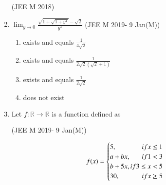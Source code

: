 \documentclass[journal,12pt,twocolumn]{IEEEtran}
\theoremstyle{remark}
\begin{document}
\begin{enumerate}[start=36]
	\hfill{(JEE M 2018)}
	\begin{enumerate}[label=(\alph*)]
	\end{enumerate}
	\item  
	$\lim_{y\to0} \frac{\sqrt{1+\sqrt{1+y^4}}-\sqrt{2}}{y^4} $
	\hfill{(JEE M 2019- 9 Jan(M))}
	\begin{enumerate}[label=(\alph*)]
		\item exists and equals $\frac{1}{4\sqrt{2}}$
		\item exists and equals $\frac{1}{2\sqrt{2}(\sqrt{2}+1)}$
		\item exists and equals $\frac{1}{2\sqrt{2}}$
		\item does not exist
	\end{enumerate}
\item Let $f : \mathbb{R}\to\mathbb{R}$ is a function defined as

	\hfill{(JEE M 2019- 9 Jan(M))}

	\begin{equation}
	    f(x)= 
	    \begin{cases}
	    5, \hfill{if x \le 1}\\
	    a + bx, \hfill{if 1 < 3}\\
	    b + 5x, \hfill{if 3 \le x < 5}\\
	    30, \hfill{if x \ge 5}
	    \end{cases}
	\end{equation}


\end{enumerate}
\end{document}

